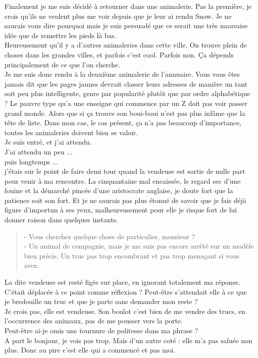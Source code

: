 Finalement je me suis décidé à retourner dans une animalerie. Pas la première, je crois qu'ils ne veulent plus me voir depuis que je leur ai rendu Snow. Je ne saurais vous dire pourquoi mais je suis persuadé que ce serait une très mauvaise idée que de remettre les pieds là bas.\\

Heureusement qu'il y a d'autres animaleries dans cette ville. On trouve plein de choses dans les grandes villes, et parfois c'est cool. Parfois non. Ça dépends principalement de ce que l'on cherche. \\

Je me suis donc rendu à la deuxième animalerie de l'annuaire. Vous vous êtes jamais dit que les pages jaunes devrait classer leurs adresses de manière un tant soit peu plus intelligente, genre par popularité plutôt que par ordre alphabétique ? Le pauvre type qu'a une enseigne qui commence par un Z doit pas voir passer grand monde. Alors que si ça trouve son boui-boui n'est pas plus infâme que la tête de liste. Dans mon cas, le cas présent, ça n'a pas beaucoup d'importance, toutes les animaleries doivent bien se valoir. \\

Je suis entré, et j'ai attendu. \\
J'ai attendu un peu ... \\
puis longtemps ... \\
j'étais sur le point de faire demi tour quand la vendeuse est sortie de nulle part pour venir à ma rencontre. La cinquantaine mal encaissée, le regard sec d'une fouine et la démarché pincée d'une aristocrate anglaise, je doute fort que la patience soit son fort. Et je ne saurais pas plus étonné de savoir que je fais déjà figure d'importun à ses yeux, malheureusement pour elle je risque fort de lui donner raison dans quelques instants. \\

\begin{quote}
- Vous cherchez quelque chose de particulier, monsieur ? \\
- Un animal de compagnie, mais je me suis pas encore arrêté sur un modèle bien précis. Un truc pas trop encombrant et pas trop menaçant si vous avez. \\
\end{quote}

La dite vendeuse est resté figée sur place, en ignorant totalement ma réponse. C'était déplacée à ce point comme réflexion ? Peut-être s'attendait elle à ce que je bredouille un truc et que je parte sans demander mon reste ? \\
Je crois pas, elle est vendeuse. Son boulot c'est bien de me vendre des trucs, en l'occurrence des animaux, pas de me pousser vers la porte. \\
Peut-être ai-je omis une tournure de politesse dans ma phrase ?\\
A part le bonjour, je vois pas trop. Mais d'un autre coté : elle m'a pas saluée non plus. Donc au pire c'est elle qui a commencé et pas moi. \\


